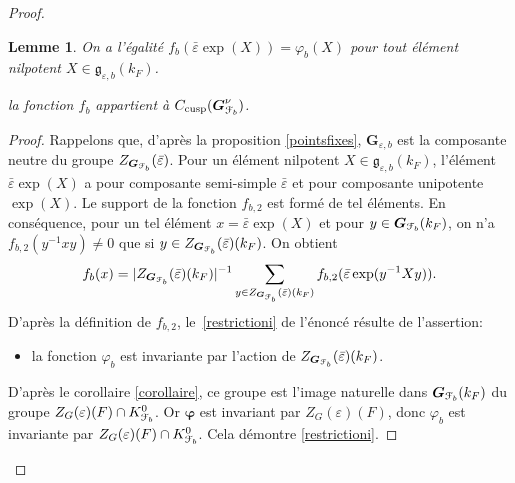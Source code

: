 \documentclass[11pt]{article}
\newcommand{\skpt}{\smallskip}
\numberwithin{equation}{section}\providecommand{\og}{«\,}\providecommand{\fg}{\,»}
\let\mathcal \EuScript
\let\oldenumerate\enumerate
\renewcommand{\enumerate}{\oldenumerate\itemindent0pt}
\newenvironment{enumeratei}
{\bgroup\def\theenumi{\roman{enumi}}\def\theenumii{\arabic{enumii}}\oldenumerate}
{\endenumerate\egroup}
\let\epsilon\varepsilon
\newcommand{\frg}{\mathfrak{g}}
\newcommand{\cusp}{\mathrm{cusp}}
\newcommand{\bG}{\boldsymbol{G}}
\newcommand{\cF}{\mathcal{F}}
\theoremstyle{plain}
\newtheorem*{lem*}{Lemme}
\theoremstyle{definition}
\begin{document}
\begin{proof}
\skpt
\begin{lem*}
\begin{enumeratei}
\item\label{restrictioni}
On a l'égalité $f_{b}(\bar{\epsilon}\exp(X))=\varphi_{b}(X)$ pour tout élément nilpotent $X\in \boldsymbol{\frg}_{\epsilon,b}(k_{F})$.

\item\label{restrictionii}
la fonction $f_{b}$ appartient à $ C_{\cusp}(\bG_{\cF_{b}}^{\nu})$.
\end{enumeratei}
\end{lem*}

\begin{proof}
Rappelons que, d'après la proposition \ref{pointsfixes}, $\bG_{\epsilon,b}$ est la composante neutre du groupe $Z_{\bG_{\cF_{b}}}(\bar{\epsilon})$. Pour un élément nilpotent $X\in \boldsymbol{\frg}_{\epsilon,b}(k_{F})$, l'élément $\bar{\epsilon}\exp(X)$ a pour composante semi-simple $\bar{\epsilon}$ et pour composante unipotente $\exp(X)$. Le support de la fonction $f_{b,2}$ est formé de tel éléments. En conséquence, pour un tel élément $x=\bar{\epsilon}\exp(X)$ et pour $y\in \bG_{\cF_{b}}(k_{F})$, on n'a $f_{b,2}(y^{-1} xy)\neq0$ que si $y\in Z_{\bG_{\cF_{b}}}(\bar{\epsilon})(k_{F})$. On obtient
\[
f_{b}(x)=\vert Z_{\bG_{\cF_{b}}}(\bar{\epsilon})(k_{F})\vert ^{-1}\sum_{y\in Z_{\bG_{\cF_{b}}}(\bar{\epsilon})(k_{F})}f_{b,2}(\bar{\epsilon}\exp(y^{-1}Xy)).
\]
D'après la définition de $f_{b,2}$, le~\eqref{restrictioni} de l'énoncé résulte de l'assertion:
\begin{itemize}
\item
la fonction $\varphi_{b}$ est invariante par l'action de $Z_{\bG_{\cF_{b}}}(\bar{\epsilon})(k_{F})$.
\end{itemize}
D'après le corollaire \ref{corollaire}, ce groupe est l'image naturelle dans $\bG_{\cF_{b}}(k_{F})$ du groupe $Z_{G}(\epsilon)(F)\cap K_{\cF_{b}}^0$. Or $\boldsymbol{\varphi}$ est invariant par $Z_{G}(\epsilon)(F)$, donc $\varphi_{b}$ est invariante par $Z_{G}(\epsilon)(F)\cap K_{\cF_{b}}^0$. Cela démontre \eqref{restrictioni}.


\end{proof}
\end{proof}
\end{document}
